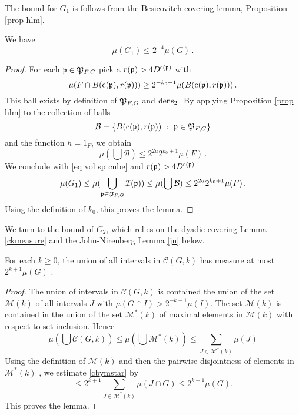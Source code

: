 The bound for $G_1$ is follows from the Besicovitch covering lemma, Proposition \ref{prop hlm}.

\begin{lemma}\label{g1bound}
We have
\begin{equation}
    \mu(G_1)\le 2^{-4}\mu(G)\, .
\end{equation}
\end{lemma}
\begin{proof}
For each $\mathfrak p\in \mathfrak P_{F,G}$ pick a
$r(\mathfrak p)>4D^{\mathrm{s}(\mathfrak p)}$  with
$$
  {\mu(F\cap B(\mathrm{c}(\mathfrak p),r(\mathfrak p)))}\ge 2^{-k_0-1}{\mu(B(\mathrm{c}(\mathfrak p),r(\mathfrak p)))}\, .
$$
This ball exists by definition of $\mathfrak P_{F,G}$
and $\operatorname{\operatorname{dens}}_2$. By applying Proposition \ref{prop hlm} to the collection of balls
$$
    \mathcal{B} = \{B(\pc(\fp),r(\fp)) \ : \ \fp \in \fP_{F,G}\}
$$
and the function $h = 1_F$, we obtain
$$
    \mu(\bigcup \mathcal{B}) \le 2^{2a} 2^{k_0 +1} \mu(F)\,.
$$
We conclude  with \eqref{eq vol sp cube} and $r(\mathfrak p)>4D^{\mathrm{s}(\mathfrak p)}$
$$
    \mu(G_1)\le \mu(\bigcup_{\mathfrak p\in \mathfrak P_{F,G}} \mathcal{I}(\mathfrak p))
    \le \mu(\bigcup \mathcal{B})\le 2^{2a} 2^{k_0 + 1} \mu (F)\,.
$$
Using the definition of $k_0$, this proves the lemma.
\end{proof}


We turn to the bound of $G_2$, which relies on the dyadic covering Lemma \ref{ckmeasure} and the
John-Nirenberg Lemma \ref{jn} below.

\begin{lemma}\label{ckmeasure}
For  each $k\ge 0$, the union of all intervals
in $\mathcal{C}(G,k)$ has measure at most $2^{k+1} \mu(G)$ .
\end{lemma}
\begin{proof}
    The union of intervals  in $\mathcal{C}(G,k)$
is contained the union of the set $\mathcal{M}(k)$
of all intervals $J$ with
${\mu(G \cap I)} > 2^{-k-1}{\mu(I)}$.
The set $\mathcal{M}(k)$ is contained in the union of
the set $\mathcal{M}^*(k)$ of maximal elements in
$\mathcal{M}(k)$ with respect to set inclusion. Hence
\begin{equation}\label{cbymstar}
\mu (\bigcup \mathcal{C}(G,k))\le \mu (\bigcup \mathcal{M}^*(k))\le
\sum_{J\in \mathcal{M}^*(k)}\mu(J)
\end{equation}
Using the definition of $\mathcal{M}(k)$ and then
the  pairwise disjointness of elements in
$\mathcal{M}^*(k)$  ,
we estimate \eqref{cbymstar} by
\begin{equation}
\le
2^{k+1}\sum_{J\in \mathcal{M}^*(k)}\mu(J\cap G)
\le 2^{k+1}\mu(G).
\end{equation}
This proves the lemma.
\end{proof}




